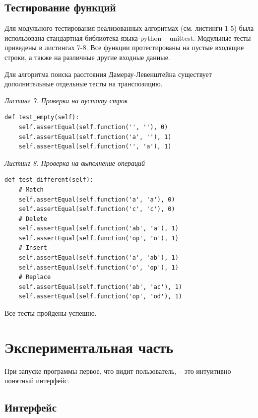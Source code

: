 \documentclass[a4paper,12pt]{article}
\begin{document}
\subsection{Тестирование функций}%

Для модульного тестирования реализованных алгоритмах (см. листинги 1-5) была использована стандартная библиотека языка python – unittest. Модульные тесты приведены в листингах 7-8. Все функции протестированы на пустые входящие строки, а также на различные другие входные данные. 

Для алгоритма поиска расстояния Дамерау-Левенштейна существует дополнительные отдельные тесты на транспозицию.

\vspace{\baselineskip}

\noindent \textit{Листинг 7. Проверка на пустоту строк}

\begin{lstlisting}
def test_empty(self):
	self.assertEqual(self.function('', ''), 0)
	self.assertEqual(self.function('a', ''), 1)
	self.assertEqual(self.function('', 'a'), 1)
\end{lstlisting}

\clearpage

\noindent \textit{Листинг 8. Проверка на выполнение операций}

\begin{lstlisting}
def test_different(self):
	# Match
	self.assertEqual(self.function('a', 'a'), 0)
	self.assertEqual(self.function('c', 'c'), 0)
	# Delete
	self.assertEqual(self.function('ab', 'a'), 1)
	self.assertEqual(self.function('op', 'o'), 1)
	# Insert
	self.assertEqual(self.function('a', 'ab'), 1)
	self.assertEqual(self.function('o', 'op'), 1)
	# Replace
	self.assertEqual(self.function('ab', 'aс'), 1)
	self.assertEqual(self.function('op', 'od'), 1)
\end{lstlisting}

\vspace{\baselineskip}

Все тесты пройдены успешно.

\clearpage

\section{Экспериментальная часть}%

При запуске программы первое, что видит пользователь, – это интуитивно понятный интерфейс.

\subsection{Интерфейс}%
\end{document}
